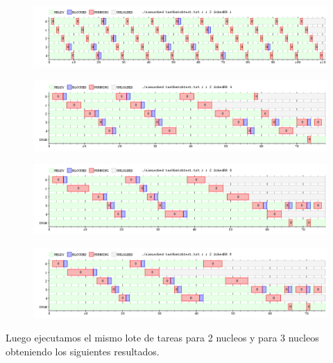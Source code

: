 \begin{figure}[H]
  \centering
\includegraphics[scale=0.45]{graficos/ejercicio7/testTask1.png}
  \caption[Task Batch con un nucleao y quantum 1]{}
\end{figure}


\begin{figure}[H]
  \centering
\includegraphics[scale=0.45]{graficos/ejercicio7/testTask4.png}
  \caption[Task Batch con un nucleo y quantum 4]{}
\end{figure}


\begin{figure}[H]
  \centering
\includegraphics[scale=0.45]{graficos/ejercicio7/testTask6.png}
  \caption[Task Batch con un nucleo y quantum 6]{}
\end{figure}


\begin{figure}[H]
  \centering
\includegraphics[scale=0.45]{graficos/ejercicio7/testTask8.png}
  \caption[Task Batch con un nucleo y  quantum 8]{}
\end{figure}
 
Luego ejecutamos el mismo lote de tareas para 2 nucleos y para 3 nucleos obteniendo los siguientes resultados.


